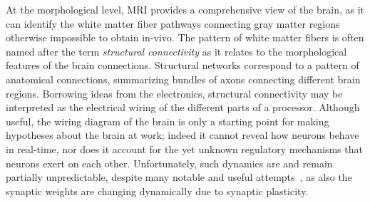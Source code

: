 At the morphological level, MRI provides a comprehensive view of the brain, as it can identify the white matter fiber pathways connecting gray matter regions otherwise impossible to obtain in-vivo.
The pattern of white matter fibers is often named after the term \emph{structural connectivity} as it relates to the morphological features of the brain connections.
Structural networks correspond to a pattern of anatomical connections, summarizing bundles of axons connecting different brain regions.
Borrowing ideas from the electronics, structural connectivity may be interpreted as the electrical wiring of the different parts of a processor.
Although useful, the wiring diagram of the brain is only a starting point for making hypotheses about the brain at work; indeed it cannot reveal how neurons behave in real-time, nor does it account for the yet unknown regulatory mechanisms that neurons exert on each other.
Unfortunately, such dynamics are and remain partially unpredictable, despite many notable and useful attempts~\cite{deco2008}, as also the synaptic weights are changing dynamically due to synaptic plasticity.

